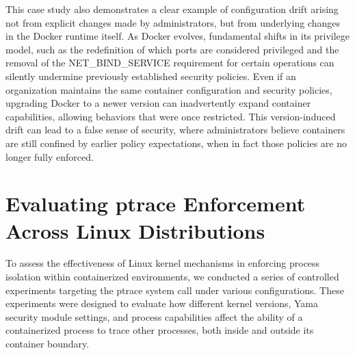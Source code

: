 \documentclass[12pt]{report}
\begin{document}
\begin{doublespace}
This case study also demonstrates a clear example of configuration drift arising not from explicit changes made by administrators, but from underlying changes in the Docker runtime itself. As Docker evolves, fundamental shifts in its privilege model, such as the redefinition of which ports are considered privileged and the removal of the NET\_BIND\_SERVICE requirement for certain operations can silently undermine previously established security policies. Even if an organization maintains the same container configuration and security policies, upgrading Docker to a newer version can inadvertently expand container capabilities, allowing behaviors that were once restricted. This version-induced drift can lead to a false sense of security, where administrators believe containers are still confined by earlier policy expectations, when in fact those policies are no longer fully enforced.



















































\section{Evaluating ptrace Enforcement Across Linux Distributions}

To assess the effectiveness of Linux kernel mechanisms in enforcing process isolation within containerized environments, we conducted a series of controlled experiments targeting the ptrace system call under various configurations. These experiments were designed to evaluate how different kernel versions, Yama security module settings, and process capabilities affect the ability of a containerized process to trace other processes, both inside and outside its container boundary.


\end{doublespace}
\end{document}
